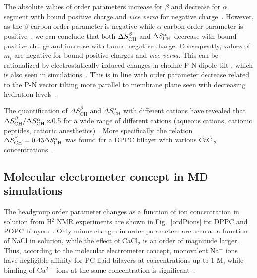 \documentclass[twoside,twocolumn,9pt]{article}
\begin{document}
The absolute values of order parameters 
increase for $\beta$ and decrease for $\alpha$ segment with bound positive charge
and {\it vice versa} for negative charge~\cite{akutsu81,altenbach84,altenbach85,seelig87,scherer89,rydall92}. 
However, as the $\beta$ carbon order parameter is negative while $\alpha$ carbon order parameter is 
positive~\cite{hong95a,hong95b,gross97}, we can conclude 
that both $\Delta S_{\rm{CH}}^{\beta}$ and $\Delta S_{\rm{CH}}^{\alpha}$ decrease with bound positive charge 
and increase with bound negative charge. Consequently, values of $m_i$ are negative for
bound positive charges and {\it vice versa}. This can be rationalized by electrostatically 
induced changes in choline P-N dipole tilt \cite{seelig87,scherer89,seelig90}, which is also
seen in simulations~\cite{gurtovenko05,cordomi08,cordomi09,zhao12}. 
This is in line with order parameter decrease related to the P-N vector tilting more parallel to membrane plane seen with decreasing hydration levels~\cite{botan15}. 


The quantification of $\Delta S_\mathrm{CH}^\beta$ and $\Delta S_\mathrm{CH}^\alpha$
with different cations
have revealed that $\Delta S_{\rm{CH}}^{\beta}/\Delta S_{\rm{CH}}^{\alpha} \approx$0.5 for a wide range
of different cations (aqueous cations, cationic peptides, cationic anesthetics)~\cite{beschiasvili91,rydall92}.
More specifically,
the relation $\Delta S_{\rm{CH}}^{\beta}=0.43 \Delta S_{\rm{CH}}^{\alpha}$ was found for a DPPC bilayer
with various CaCl$_2$ concentrations~\cite{akutsu81}.


\subsection{Molecular electrometer concept in MD simulations}\label{electrometerinsimulations}

The headgroup order parameter changes as a function of ion concentration in
solution from H$^2$ NMR experiments are shown in Fig.~\ref{ordPions} for DPPC and POPC bilayers~\cite{akutsu81,altenbach84}.
Only minor changes in order parameters are seen
as a function of NaCl in solution, 
while the effect of CaCl$_2$ is an order of magnitude larger. 
Thus, according to the molecular electrometer concept, 
monovalent Na$^+$ ions have negligible affinity for PC lipid bilayers at concentrations up to 1 M,
while binding of Ca$^{2+}$ ions at the same concentration is significant~\cite{akutsu81,altenbach84}. 
\end{document}
